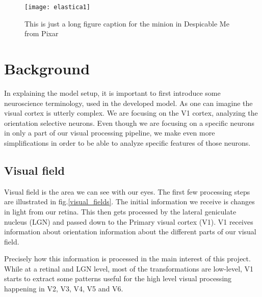 \begin{figure}[htbp!] 
\centering    
\texttt{[image: elastica1]}
\caption[Minion]{This is just a long figure caption for the minion in Despicable Me from Pixar}
\label{fig:elastica1}
\end{figure}





\chapter{Background}

In explaining the model setup, it is important to first introduce some neuroscience terminology, used in the developed model. As one can imagine the visual cortex is utterly complex. We are focusing on the V1 cortex, analyzing the orientation selective neurons. Even though we are focusing on a specific neurons in only a part of our visual processing pipeline, we make even more simplifications in order to be able to analyze specific features of those neurons. 

\section{Visual field}





Visual field is the area we can see with our eyes. The first few processing steps are illustrated in fig.\ref{visual_fields}. The initial information we receive is changes in light from our retina. This then gets processed by the lateral geniculate nucleus (LGN) and passed down to the Primary visual cortex (V1). V1 receives information about orientation information about the different parts of our visual field. 


Precisely how this information is processed in the main interest of this project. While at a retinal and LGN level, most of the transformations are low-level, V1 starts to extract some patterns useful for the high level visual processing happening in V2, V3, V4, V5 and V6. 

